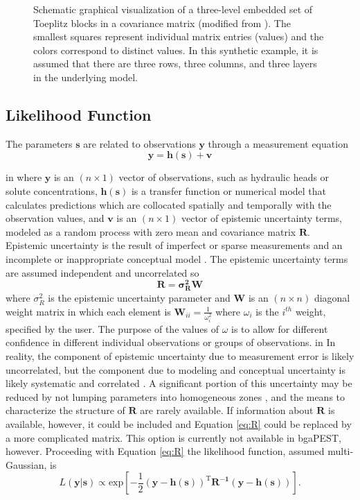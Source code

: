 \documentclass[11pt,oneside,onecolumn]{usgsreport}
\begin{document}
\begin{appendix}
\begin{bibunit}
\begin{figure}[!t]
\caption{\label{fig:toep}Schematic graphical visualization of a three-level
embedded set of Toeplitz blocks in a covariance matrix (modified from
\citet{MarcoDiss}). The smallest squares represent individual matrix
entries (values) and the colors correspond to distinct values. In
this synthetic example, it is assumed that there are three rows, three
columns, and three layers in the underlying model.}
\end{figure}



\subsection{Likelihood Function}

The parameters $\mathbf{s}$ are related to observations $\mathbf{y}$
through a measurement equation
\[
\mathbf{y=h(s)+v}
\]

 in
where $\mathbf{y}$ is an $(n\times1)$ vector of observations, such
as hydraulic heads or solute concentrations, $\mathbf{h(s)}$ is a
transfer function or numerical model that calculates predictions which
are collocated spatially and temporally with the observation values,
and $\mathbf{v}$ is an $(n\times1)$ vector of epistemic uncertainty
terms, modeled as a random process with zero mean and covariance matrix
$\mathbf{R.}$ Epistemic uncertainty is the result of imperfect or
sparse measurements and an incomplete or inappropriate conceptual
model \citep[p. 4]{Rubin2003}. The epistemic uncertainty terms are
assumed independent and uncorrelated so
\begin{equation}
\mathbf{R=\sigma_{R}^{2}W}\label{eq:R}
\end{equation}
 where $\sigma_{R}^{2}$ is the epistemic uncertainty parameter and
\textbf{$\mathbf{W}$} is an $(n\times n)$ diagonal weight matrix
in which each element is $\mathbf{W}_{ii}=\frac{1}{\omega_{i}^{2}}$
where $\omega_{i}$ is the $i^{th}$ weight, specified by the user.
The purpose of the values of $\omega$ is to allow for different confidence
in different individual observations or groups of observations.
 in
In reality, the component of epistemic uncertainty due to measurement
error is likely uncorrelated, but the component due to modeling and
conceptual uncertainty is likely systematic and correlated \citep{GaganisSmith2001}.
A significant portion of this uncertainty may be reduced by not lumping
parameters into homogeneous zones \citep{GallagherDoherty2007}, and
the means to characterize the structure of $\mathbf{R}$ are rarely
available. If information about $\mathbf{R}$ is available, however,
it could be included and Equation \ref{eq:R} could be replaced by
a more complicated matrix. This option is currently not available
in bgaPEST, however. Proceeding with Equation \ref{eq:R} the likelihood
function, assumed multi-Gaussian, is
\begin{equation}
L(\mathbf{y|s})\propto\mathrm{exp\left[-\frac{1}{2}\left(\mathbf{y-h}(\mathbf{s})\right)^{T}\mathbf{R^{-1}\left(\mathbf{y-h}(\mathbf{s})\right)}\right].}\label{eq:likelihood}
\end{equation}



\end{bibunit}
\end{appendix}
\end{document}
